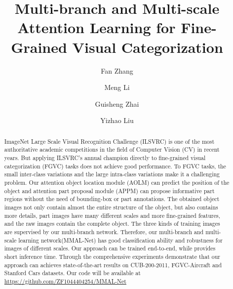 \documentclass[runningheads]{llncs}
\begin{document}
\title{Multi-branch and Multi-scale Attention Learning for Fine-Grained Visual Categorization}
\author{Fan Zhang\inst{} \and
Meng Li\inst{} \and
Guisheng Zhai\inst{}\and
Yizhao Liu\inst{}}
\maketitle              \begin{abstract}
ImageNet Large Scale Visual Recognition Challenge (ILSVRC) is one of the most authoritative academic competitions in the field of Computer Vision (CV) in recent years. But applying ILSVRC's annual champion directly to fine-grained visual categorization (FGVC) tasks does not achieve good performance. To FGVC tasks, the small inter-class variations and the large intra-class variations make it a challenging problem. Our attention object location module (AOLM) can predict the position of the object and attention part proposal module (APPM) can propose informative part regions without the need of bounding-box or part annotations. The obtained object images not only contain almost the entire structure of the object, but also contains more details, part images have many different scales and more fine-grained features, and the raw images contain the complete object. The three kinds of training images are supervised by our multi-branch network. Therefore, our multi-branch and multi-scale learning network(MMAL-Net) has good classification ability and robustness for images of different scales. Our approach can be trained end-to-end, while provides short inference time. Through the comprehensive experiments demonstrate that our approach can achieves state-of-the-art results on CUB-200-2011, FGVC-Aircraft and Stanford Cars datasets. Our code will be available at \url{https://github.com/ZF1044404254/MMAL-Net}
\end{abstract}
\end{document}
